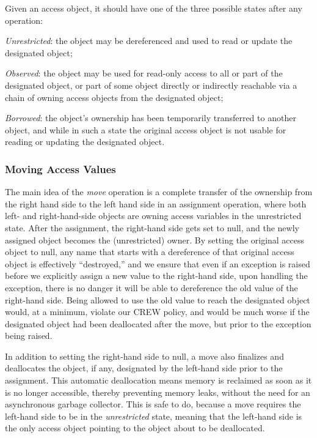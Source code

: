 \documentclass{llncs}
\begin{document}
Given an access object, it should have one of the three possible states after any operation:

\begin{compactitem} 
  \item \textit {Unrestricted}: the object may be dereferenced and used to read or update the designated object;
  \item \textit {Observed}: the object may be used for read-only access to all or part of the designated object, or part of some object directly or indirectly reachable via a chain of owning access objects from the designated object;
  \item \textit {Borrowed}: the object's ownership has been temporarily transferred to another object,  and while in such a state the original access object is not usable for reading or updating the designated object.
\end{compactitem}


\subsubsection{Moving Access Values}
\label{sec:moving}

The main idea of the \textit{move} operation is a complete transfer of the ownership from the right hand side to the left hand side in an assignment operation, where both left- and right-hand-side objects are owning access variables in the unrestricted state.
After the assignment, the right-hand side gets set to null, and the newly assigned object becomes the (unrestricted) owner. By setting the original access object to null, any name that starts with a dereference of
that original access object is effectively ``destroyed,'' and we ensure that even if an exception is raised before we explicitly assign a new value to the right-hand side, upon handling the exception, there is no danger it will
be able to dereference the old value of the right-hand side.  Being allowed to use the old value to reach the designated object would, at a minimum, violate our CREW policy, and would be much worse if the designated object had been deallocated after the move, but prior to the exception being raised.

\smallskip
In addition to setting the right-hand side to null, a move also finalizes and deallocates the object, if any, designated by the
left-hand side prior to the assignment.  This automatic deallocation means memory is reclaimed as soon as it is
no longer accessible, thereby preventing memory leaks, without the need for an asynchronous garbage collector.
This is safe to do, because a move requires the left-hand side to be in the \textit{unrestricted} state, meaning that
the left-hand side is the only access object pointing to the object about to be deallocated.
\end{document}
